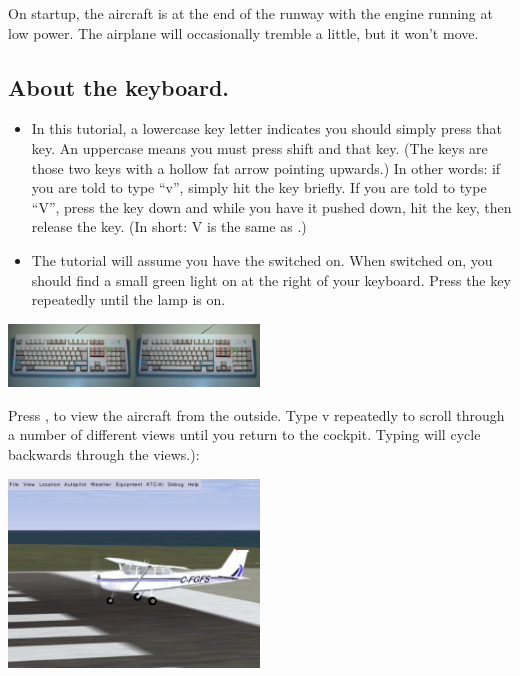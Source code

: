 \begin{itemize}
On startup, the aircraft is at the end of the runway with the engine running
at low power. The airplane will occasionally tremble a little, but it won't
move.

\subsection*{About the keyboard.}

\begin{itemize}
    \item In this tutorial, a lowercase key letter indicates you should simply
  press that key. An uppercase means you must press shift and that key.
  (The \textcolor{blue}{} keys are those two keys with
  a hollow fat arrow pointing upwards.) In other words: if you are told to type
  ``v'', simply hit the  key briefly.
   If you are told to type ``V'',
  press the  key down and while you have it pushed down, hit the
   key, then release the   key. (In short: V is the same as
  .)
    \item The tutorial will assume you have the  switched on.
   When switched on, you should find a small green
  light on at the right of your keyboard. Press the
  \textcolor{green}{} key repeatedly until the lamp is on.
\end{itemize}

\begin{center}
\includegraphics[width=0.5\textwidth]{img/tut_7}
\end{center}

Press , to view the aircraft from the outside. Type v repeatedly to
scroll through a number of different views until you return to the cockpit.
Typing  will cycle backwards through the views.):

\begin{center}
\includegraphics[width=0.5\textwidth]{img/tut_8}
\end{center}


\end{itemize}
